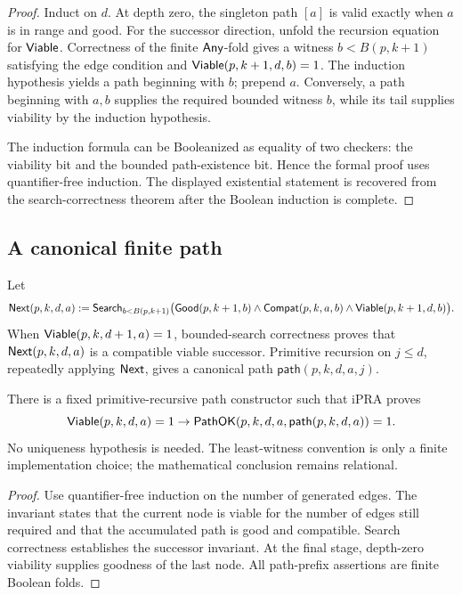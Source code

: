 \begin{proof}
Induct on \(d\).  At depth zero, the singleton path \([a]\) is valid exactly
when \(a\) is in range and good.  For the successor direction, unfold the
recursion equation for \(\mathsf{Viable}\).  Correctness of the finite \(\mathsf{Any}\)-fold
gives a witness \(b<B(p,k+1)\) satisfying the edge condition and
\(\mathsf{Viable}(p,k+1,d,b)=1\).  The induction hypothesis yields a path beginning
with \(b\); prepend \(a\).  Conversely, a path beginning with \(a,b\) supplies
the required bounded witness \(b\), while its tail supplies viability by the
induction hypothesis.

The induction formula can be Booleanized as equality of two checkers: the
viability bit and the bounded path-existence bit.  Hence the formal proof uses
quantifier-free induction.  The displayed existential statement is recovered
from the search-correctness theorem after the Boolean induction is complete.
\end{proof}

\subsection{A canonical finite path}

Let
\[
 \mathsf{Next}(p,k,d,a)
\mathrel{:=} \mathsf{Search}_{b<B(p,k+1)}
  \bigl(\mathsf{Good}(p,k+1,b)\wedge\mathsf{Compat}(p,k,a,b)
       \wedge\mathsf{Viable}(p,k+1,d,b)\bigr).
\]
When \(\mathsf{Viable}(p,k,d+1,a)=1\), bounded-search correctness proves that
\(\mathsf{Next}(p,k,d,a)\) is a compatible viable successor.  Primitive recursion on
\(j\le d\), repeatedly applying \(\mathsf{Next}\), gives a canonical path
\(\mathsf{path}(p,k,d,a,j)\).

\begin{corollary}
\label{cor:least-viable-path}
There is a fixed primitive-recursive path constructor such that iPRA proves
\[
 \mathsf{Viable}(p,k,d,a)=1\to
 \mathsf{PathOK}(p,k,d,a,\mathsf{path}(p,k,d,a))=1.
\]
No uniqueness hypothesis is needed.  The least-witness convention is only a
finite implementation choice; the mathematical conclusion remains relational.
\end{corollary}

\begin{proof}
Use quantifier-free induction on the number of generated edges.  The invariant
states that the current node is viable for the number of edges still required
and that the accumulated path is good and compatible.  Search correctness
establishes the successor invariant.  At the final stage, depth-zero viability
supplies goodness of the last node.  All path-prefix assertions are finite
Boolean folds.
\end{proof}

